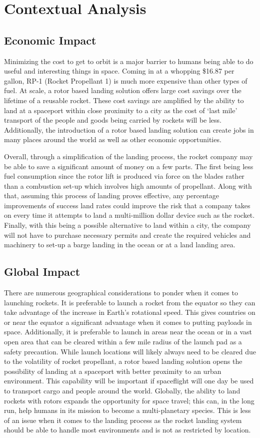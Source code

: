 \chapter{Contextual Analysis}
\section{Economic Impact}
Minimizing the cost to get to orbit is a major barrier to humans being able to do useful and interesting things in space. Coming in at a whopping \$16.87 per gallon, RP-1 (Rocket Propellant 1) is much more expensive than other types of fuel. At scale, a rotor based landing solution offers large cost savings over the lifetime of a reusable rocket. These cost savings are amplified by the ability to land at a spaceport within close proximity to a city as the cost of ‘last mile’ transport of the people and goods being carried by rockets will be less. Additionally, the introduction of a rotor based landing solution can create jobs in many places around the world as well as other economic opportunities. 

Overall, through a simplification of the landing process, the rocket company may be able to save a significant amount of money on a few parts. The first being less fuel consumption since the rotor lift is produced via force on the blades rather than a combustion set-up which involves high amounts of propellant. Along with that, assuming this process of landing proves effective, any percentage improvements of success land rates could improve the risk that a company takes on every time it attempts to land a multi-million dollar device such as the rocket. Finally, with this being a possible alternative to land within a city, the company will not have to purchase necessary permits and create the required vehicles and machinery to set-up a barge landing in the ocean or at a land landing area.

\section{Global Impact}
There are numerous geographical considerations to ponder when it comes to launching rockets. It is preferable to launch a rocket from the equator so they can take advantage of the increase in Earth’s rotational speed. This gives countries on or near the equator a significant advantage when it comes to putting payloads in space. Additionally, it is preferable to launch in areas near the ocean or in a vast open area that can be cleared within a few mile radius of the launch pad as a safety precaution. While launch locations will likely always need to be cleared due to the volatility of rocket propellant, a rotor based landing solution opens the possibility of landing at a spaceport with better proximity to an urban environment. This capability will be important if spaceflight will one day be used to transport cargo and people around the world. 
Globally, the ability to land rockets with rotors expands the opportunity for space travel; this can, in the long run, help humans in its mission to become a multi-planetary species. This is less of an issue when it comes to the landing process as the rocket landing system should be able to handle most environments and is not as restricted by location.

